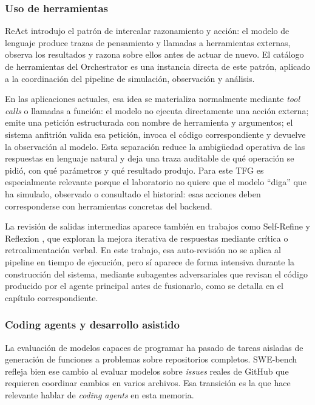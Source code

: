 \subsubsection{Uso de herramientas}

ReAct \cite{yao2023react} introdujo el patrón de intercalar razonamiento y
acción: el modelo de lenguaje produce trazas de pensamiento y llamadas a
herramientas externas, observa los resultados y razona sobre ellos antes de
actuar de nuevo. El catálogo de herramientas del Orchestrator es una
instancia directa de este patrón, aplicado a la coordinación del pipeline de
simulación, observación y análisis.

En las aplicaciones actuales, esa idea se materializa normalmente mediante
\textit{tool calls} o llamadas a función: el modelo no ejecuta directamente una
acción externa; emite una petición estructurada con nombre de
herramienta y argumentos; el sistema anfitrión valida esa petición, invoca el
código correspondiente y devuelve la observación al modelo. Esta separación
reduce la ambigüedad operativa de las respuestas en lenguaje natural y deja una
traza auditable de qué operación se pidió, con qué parámetros y qué resultado
produjo. Para este TFG es especialmente relevante porque el laboratorio no
quiere que el modelo ``diga'' que ha simulado, observado o consultado el
historial: esas acciones deben corresponderse con herramientas concretas del
backend.

La revisión de salidas intermedias aparece también en trabajos como
Self-Refine \cite{madaan2023selfrefine} y Reflexion
\cite{shinn2023reflexion}, que exploran la mejora iterativa de respuestas
mediante crítica o retroalimentación verbal. En este trabajo, esa auto-revisión
no se aplica al pipeline en tiempo de ejecución, pero sí aparece de forma
intensiva durante la construcción del sistema, mediante subagentes
adversariales que revisan el código producido por el agente principal antes de
fusionarlo, como se detalla en el capítulo correspondiente.

\subsubsection{Coding agents y desarrollo asistido}

La evaluación de modelos capaces de programar ha pasado de tareas aisladas
de generación de funciones a problemas sobre repositorios completos.
SWE-bench \cite{jimenez2024swebench} refleja bien ese cambio al evaluar
modelos sobre \textit{issues} reales de GitHub que requieren coordinar
cambios en varios archivos. Esa transición es la que hace relevante hablar
de \textit{coding agents} en esta memoria.

